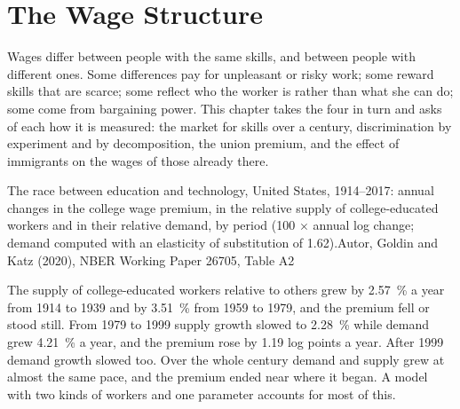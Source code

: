 \chapter{The Wage Structure}\label{ch:b3:wage-structure}

Wages differ between people with the same skills, and between people with
different ones. Some differences pay for unpleasant or risky work; some reward
skills that are scarce; some reflect who the worker is rather than what she can do;
some come from bargaining power. This chapter takes the four in turn and asks of
each how it is measured: the market for skills over a century, discrimination by
experiment and by decomposition, the union premium, and the effect of immigrants
on the wages of those already there.

\begin{openingchart}{The race between education and technology, United States,
1914--2017: annual changes in the college wage premium, in the relative supply of
college-educated workers and in their relative demand, by period (100 $\times$ annual log
change; demand computed with an elasticity of substitution of 1.62).}{Autor, Goldin
and Katz (2020), NBER Working Paper 26705, Table A2}
\end{openingchart}

The supply of college-educated workers relative to others grew by 2.57~\% a year from 1914 to
1939 and by 3.51~\% from 1959 to 1979, and the premium fell or stood still. From 1979 to 1999
supply growth slowed to 2.28~\% while demand grew 4.21~\% a year, and the premium rose by 1.19
log points a year. After 1999 demand growth slowed too. Over the whole century demand
and supply grew at almost the same pace, and the premium ended near where it
began. A model with two kinds of workers and one parameter accounts for most of this.

